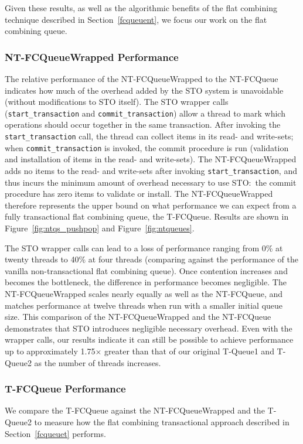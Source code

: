 Given these results, as well as the algorithmic benefits of the flat combining technique described in Section~\ref{fcqueuent}, we focus our work on the flat combining queue.

\subsubsection{NT-FCQueueWrapped Performance}
The relative performance of the NT-FCQueueWrapped to the NT-FCQueue indicates how much of the overhead added by the STO system is unavoidable (without modifications to STO itself). The STO wrapper calls (\texttt{start\_transaction} and \texttt{commit\_transaction}) allow a thread to mark which operations should occur together in the same transaction. After invoking the \texttt{start\_transaction} call, the thread can collect items in its read- and write-sets; when \texttt{commit\_transaction} is invoked, the commit procedure is run (validation and installation of items in the read- and write-sets). The NT-FCQueueWrapped adds no items to the read- and write-sets after invoking \texttt{start\_transaction}, and thus incurs the minimum amount of overhead necessary to use STO:\ the commit procedure has zero items to validate or install. The NT-FCQueueWrapped therefore represents the upper bound on what performance we can expect from a fully transactional flat combining queue, the T-FCQueue. 
Results are shown in Figure~\ref{fig:ntqs_pushpop} and Figure~\ref{fig:ntqueues}. 

The STO wrapper calls can lead to a loss of performance ranging from 0\% at twenty threads to 40\% at four threads (comparing against the performance of the vanilla non-transactional flat combining queue). Once contention increases and becomes the bottleneck, the difference in performance becomes negligible. The NT-FCQueueWrapped scales nearly equally as well as the NT-FCQueue, and matches performance at twelve threads when run with a smaller initial queue size. This comparison of the NT-FCQueueWrapped and the NT-FCQueue demonstrates that STO introduces negligible necessary overhead. Even with the wrapper calls, our results indicate it can still be possible to achieve performance up to approximately 1.75$\times$ greater than that of our original T-Queue1 and T-Queue2 as the number of threads increases.

\subsubsection{T-FCQueue Performance}
We compare the T-FCQueue against the NT-FCQueueWrapped and the T-Queue2 to measure how the flat combining transactional approach described in Section~\ref{fcqueuet} performs.

